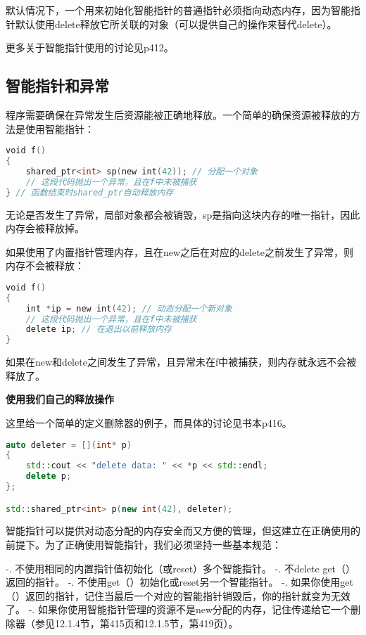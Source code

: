 \documentclass[
  a4paper,
  oneside,tablecaptionabove
]{scrbook}
\begin{document}
默认情况下，一个用来初始化智能指针的普通指针必须指向动态内存，因为智能指针默认使用delete释放它所关联的对象（可以提供自己的操作来替代delete）。

更多关于智能指针使用的讨论见p412。

\subsection{智能指针和异常}\label{ux667aux80fdux6307ux9488ux548cux5f02ux5e38}

程序需要确保在异常发生后资源能被正确地释放。一个简单的确保资源被释放的方法是使用智能指针：

\begin{lstlisting}[language={C++}]
void f()
{
    shared_ptr<int> sp(new int(42)); // 分配一个对象
    // 这段代码抛出一个异常，且在f中未被捕获
} // 函数结束时shared_ptr自动释放内存
\end{lstlisting}

无论是否发生了异常，局部对象都会被销毁，sp是指向这块内存的唯一指针，因此内存会被释放掉。

如果使用了内置指针管理内存，且在new之后在对应的delete之前发生了异常，则内存不会被释放：

\begin{lstlisting}[language={C++}]
void f()
{
    int *ip = new int(42); // 动态分配一个新对象
    // 这段代码抛出一个异常，且在f中未被捕获
    delete ip; // 在退出以前释放内存
}
\end{lstlisting}

如果在new和delete之间发生了异常，且异常未在f中被捕获，则内存就永远不会被释放了。

\textbf{使用我们自己的释放操作}

这里给一个简单的定义删除器的例子，而具体的讨论见书本p416。

\begin{lstlisting}[language={C++}]
auto deleter = [](int* p)
{   
    std::cout << "delete data: " << *p << std::endl;
    delete p;
};  

std::shared_ptr<int> p(new int(42), deleter);
\end{lstlisting}

智能指针可以提供对动态分配的内存安全而又方便的管理，但这建立在正确使用的前提下。为了正确使用智能指针，我们必须坚持一些基本规范：

-. 不使用相同的内置指针值初始化（或reset）多个智能指针。 -. 不delete
get（）返回的指针。 -. 不使用get（）初始化或reset另一个智能指针。 -.
如果你使用get（）返回的指针，记住当最后一个对应的智能指针销毁后，你的指针就变为无效了。
-.
如果你使用智能指针管理的资源不是new分配的内存，记住传递给它一个删除器（参见12.1.4节，第415页和12.1.5节，第419页）。
\end{document}
